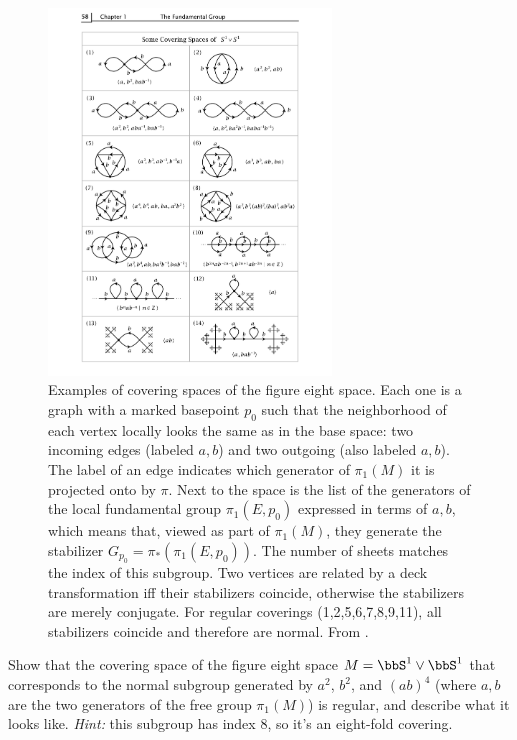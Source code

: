 \begin{figure}[tp]
    \centering
    \includegraphics[width=0.67\textwidth]{figures/coverings_8.pdf}
    \caption{Examples of covering spaces of the figure eight space. Each one is a graph with a marked basepoint $p_0$ such that the neighborhood of each vertex locally looks the same as in the base space: two incoming edges (labeled $a,b$) and two outgoing (also labeled $a,b$). The label of an edge indicates which generator of $\pi_1(M)$ it is projected onto by $\pi$. Next to the space is the list of the generators of the local fundamental group $\pi_1(E,p_0)$ expressed in terms of $a,b$, which means that, viewed as part of $\pi_1(M)$, they generate the stabilizer $G_{p_0}=\pi_\ast(\pi_1(E,p_0))$. The number of sheets matches the index of this subgroup. Two vertices are related by a deck transformation iff their stabilizers coincide, otherwise the stabilizers are merely conjugate. For regular coverings (1,2,5,6,7,8,9,11), all stabilizers coincide and therefore are normal. From \cite[p.~58]{Hatcher}.}
    \label{fig:coverings of 8}
\end{figure}


\begin{xca}
    Show that the covering space of the figure eight space $M=\bbS^1\vee \bbS^1$ that corresponds to the normal subgroup generated by $a^2$, $b^2$, and $(ab)^4$ (where $a,b$ are the two generators of the free group $\pi_1(M)$) is regular, and describe what it looks like. \emph{Hint:} this subgroup has index 8, so it's an eight-fold covering.
\end{xca}

